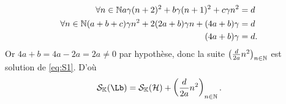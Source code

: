 \begin{itemize}
\begin{itemize}
    \begin{align}
      \forall n \in \mathbb{N} a\gamma(n+2)^2 +b\gamma(n+1)^2 +c\gamma n^2 &=d\\
      \forall n \in \mathbb{N} (a+b+c)\gamma n^2 +2(2a+b)\gamma n +(4a+b)\gamma &=d \\
      (4a+b)\gamma &=d.
    \end{align}
    Or $4a+b=4a-2a=2a \neq 0$ par hypothèse, donc la suite $\left(\frac{d}{2a} n^2\right)_{n \in \mathbb{N}}$ est solution de \eqref{eq:S1}. D'où
    \begin{equation}
      \S_\K(\Lb) = \S_\K(\H) + \left(\frac{d}{2a} n^2\right)_{n \in \N}.
    \end{equation}
  \end{itemize}
\end{itemize}
